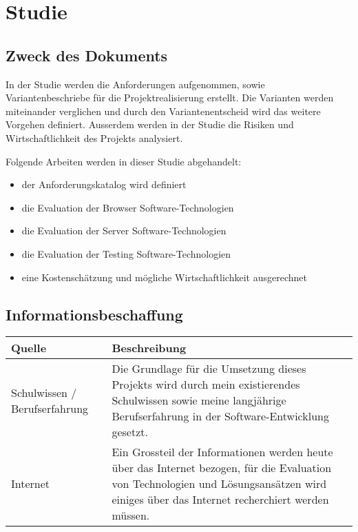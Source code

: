 \chapter{Studie}

\label{AppendixStudie}

\section{Zweck des Dokuments}\label{StudieZweck}

In der Studie werden die Anforderungen aufgenommen, sowie Variantenbeschriebe
für die Projektrealisierung erstellt. Die Varianten werden miteinander
verglichen und durch den Variantenentscheid wird das weitere
Vorgehen definiert.
Ausserdem werden in der Studie die Risiken und Wirtschaftlichkeit des Projekts
analysiert.

Folgende Arbeiten werden in dieser Studie abgehandelt:

\begin{itemize}
  \tightlist
  \item der Anforderungskatalog wird definiert
  \item die Evaluation der Browser Software-Technologien
  \item die Evaluation der Server Software-Technologien
  \item die Evaluation der Testing Software-Technologien
  \item eine Kostenschätzung und mögliche Wirtschaftlichkeit ausgerechnet
\end{itemize}


\section{Informationsbeschaffung}\label{informationsbeschaffung}

\begin{longtable}[]{@{}lp{10cm}@{}}
  \toprule
  Quelle                        & Beschreibung\tabularnewline
  \toprule
  Schulwissen / Berufserfahrung & Die Grundlage für die Umsetzung dieses Projekts wird durch mein existierendes Schulwissen sowie meine langjährige Berufserfahrung in der Software-Entwicklung gesetzt.\tabularnewline
  \midrule
  Internet                      & Ein Grossteil der Informationen werden heute über das Internet bezogen, für die Evaluation von Technologien und Lösungsansätzen wird einiges über das Internet recherchiert werden müssen.\tabularnewline
  \bottomrule
\end{longtable}

